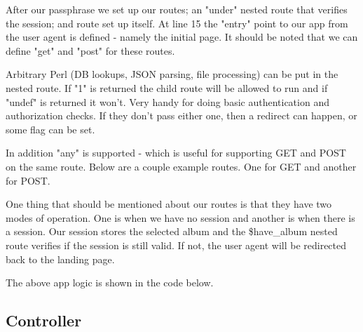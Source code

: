 \documentclass[14pt]{extreport}
\newcommand\Small{\fontsize{12}{13.0}\fontencoding{T1}\selectfont}
\newcommand*\LSTfont{\Small\ttfamily\SetTracking{encoding=*}{-60}\lsstyle}
\begin{document}


After our passphrase we set up our routes; an "under" nested route that verifies
the session; and route set up itself.  At line 15 the "entry" point to our app
from the user agent is defined - namely the initial page.  It should be noted
that we can define "get" and "post" for these routes.  



Arbitrary Perl (DB lookups, JSON parsing, file processing) can be put in the
nested route.  If "1" is returned the child route will be allowed to run and if
"undef" is returned it won't.  Very handy for doing basic authentication and
authorization checks.  If they don't pass either one, then a redirect can
happen, or some flag can be set.

\clearpage

In addition "any" is supported - which is useful for supporting GET and POST on
the same route.  Below are a couple example routes.  One for GET and another
for POST.



One thing that should be mentioned about our routes is that they have two modes of
operation.  One is when we have no session and another is when there is a session.
Our session stores the selected album and the \$have\_album nested route verifies
if the session is still valid.  If not, the user agent will be redirected back to the
landing page.

The above app logic is shown in the code below.



\subsection{Controller}
\end{document}
